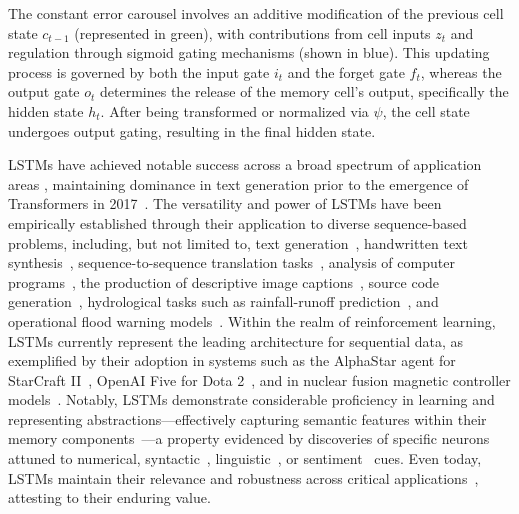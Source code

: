 The constant error carousel involves an additive modification of the previous cell state $c_{t-1}$ (represented in green), with contributions from cell inputs $z_t$ and regulation through sigmoid gating mechanisms (shown in blue). This updating process is governed by both the input gate $i_t$ and the forget gate $f_t$, whereas the output gate $o_t$ determines the release of the memory cell’s output, specifically the hidden state $h_t$. After being transformed or normalized via $\psi$, the cell state undergoes output gating, resulting in the final hidden state.

LSTMs have achieved notable success across a broad spectrum of application areas \citep{Hochreiter:01,Hochreiter:07,Schmidhuber:15}, maintaining dominance in text generation prior to the emergence of Transformers in 2017~\citep{Vaswani:17}. The versatility and power of LSTMs have been empirically established through their application to diverse sequence-based problems, including, but not limited to, text generation~\citep{Graves:13,Karpathy:15blog}, handwritten text synthesis~\citep{Graves:13}, sequence-to-sequence translation tasks~\citep{Sutskever:14nips}, analysis of computer programs~\citep{Zaremba:14arxiv}, the production of descriptive image captions~\citep{Karpathy:15,Hossain:19}, source code generation~\citep{Karpathy:15blog}, hydrological tasks such as rainfall-runoff prediction~\citep{Kratzert:18,Kratzert:19}, and operational flood warning models~\citep{Nearing:24}. Within the realm of reinforcement learning, LSTMs currently represent the leading architecture for sequential data, as exemplified by their adoption in systems such as the AlphaStar agent for StarCraft II~\citep{Vinyals:17short}, OpenAI Five for Dota 2~\citep{OpenAI:19}, and in nuclear fusion magnetic controller models~\citep{Degrave:22short}. Notably, LSTMs demonstrate considerable proficiency in learning and representing abstractions—effectively capturing semantic features within their memory components~\citep{Karpathy:15blog}—a property evidenced by discoveries of specific neurons attuned to numerical, syntactic~\citep{Lakretz:19}, linguistic~\citep{Bau:19}, or sentiment~\citep{Radford:17arxiv} cues. Even today, LSTMs maintain their relevance and robustness across critical applications~\citep{Degrave:22short,Nearing:24}, attesting to their enduring value.

